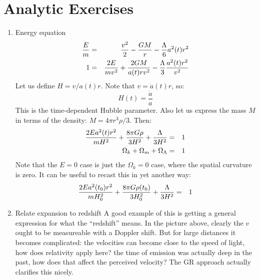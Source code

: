 \section{Analytic Exercises}

\begin{enumerate}
\item Energy equation
\begin{eqnarray}
\frac{E}{m} &=& \frac{v^2}{2}-\frac{GM}{r} - \frac{\Lambda}{6}a^2(t)r^2 \cr
1 &=& \frac{2E}{mv^2} + \frac{2GM}{a(t) rv^2} -
\frac{\Lambda}{3}\frac{a^2(t) r^2}{v^2} 
\end{eqnarray}
Let us define $H=v/a(t)r$. Note that $v={\dot a}(t) r$, so:
\begin{equation}
H(t) = \frac{\dot a}{a}
\end{equation}
This is the time-dependent Hubble parameter. Also let us express the
mass $M$ in terms of the density: $M=4\pi r^3\rho/3$. Then:
\begin{eqnarray}
\frac{2Ea^2(t) r^2}{mH^2} + \frac{8\pi
  G\rho}{3H^2}+\frac{\Lambda}{3H^2} &=& 1 \cr 
\Omega_k + \Omega_m + \Omega_\Lambda &=& 1
\end{eqnarray}
Note that the $E=0$ case is just the $\Omega_k=0$ case, where the
spatial curvature is zero. It can be useful to recast this in yet
another way:
\begin{eqnarray}
\frac{2Ea^2(t_0) r^2}{mH_0^2} + \frac{8\pi
  G\rho(t_0)}{3H_0^2}+\frac{\Lambda}{3H^2} &=& 1 \cr 
\end{eqnarray}
\item Relate expansion to redshift
A good example of this is getting a general expression for what the
``redshift'' means. In the picture above, clearly the $v$ ought to be
measureable with a Doppler shift. But for large distances it becomes
complicated: the velocities can become close to the speed of light,
how does relativity apply here? the time of emission was actually deep
in the past, how does that affect the perceived velocity? The GR
approach actually clarifies this nicely.


\end{enumerate}
